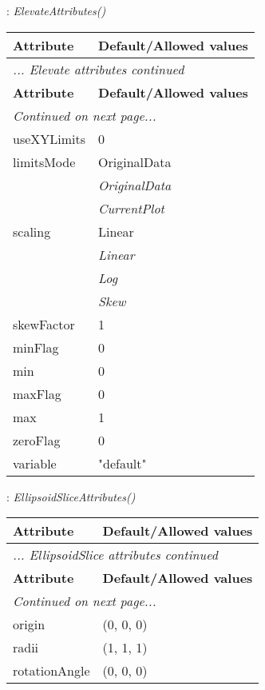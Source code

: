 \documentclass[10pt,a4paper]{report}
\begin{document}
\newpage

{}
: {\it ElevateAttributes() }\\[-3mm]

\begin{longtable}{ll}
{\bf Attribute} & {\bf Default/Allowed values} \\
\hline \hline
\endfirsthead
\multicolumn{2}{l}{{\it ... Elevate attributes continued}} \\
{\bf Attribute} & {\bf Default/Allowed values} \\
\hline \hline
\endhead
\hline
\multicolumn{2}{l}{{\it Continued on next page...}} \\
\endfoot
\hline
\endlastfoot

useXYLimits  &  0 \\
limitsMode  &  OriginalData   \\
 & {\it  OriginalData} \\
 & {\it  CurrentPlot} \\
scaling  &  Linear   \\
 & {\it  Linear} \\
 & {\it  Log} \\
 & {\it  Skew} \\
skewFactor  &  1 \\
minFlag  &  0 \\
min  &  0 \\
maxFlag  &  0 \\
max  &  1 \\
zeroFlag  &  0 \\
variable  &  "default" \\
\end{longtable}

\newpage

{}
: {\it EllipsoidSliceAttributes() }\\[-3mm]

\begin{longtable}{ll}
{\bf Attribute} & {\bf Default/Allowed values} \\
\hline \hline
\endfirsthead
\multicolumn{2}{l}{{\it ... EllipsoidSlice attributes continued}} \\
{\bf Attribute} & {\bf Default/Allowed values} \\
\hline \hline
\endhead
\hline
\multicolumn{2}{l}{{\it Continued on next page...}} \\
\endfoot
\hline
\endlastfoot

origin  &  (0, 0, 0) \\
radii  &  (1, 1, 1) \\
rotationAngle  &  (0, 0, 0) \\
\end{longtable}
\end{document}
